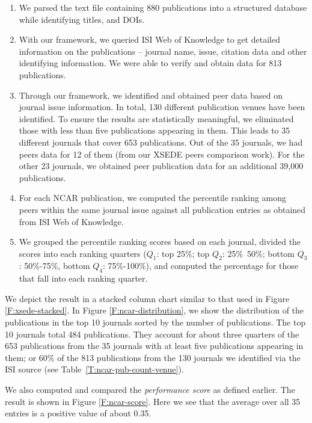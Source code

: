 \documentclass[10pt, conference, compsocconf]{IEEEtran}
\begin{document}
\begin{enumerate}

\item We parsed the text file containing 880 publications into a structured database while identifying titles, and DOIs.

\item With our framework, we queried ISI Web of Knowledge to get detailed information on the publications -- journal name, issue, citation data and other identifying information. We were able to verify and obtain data for 813 publications.

\item Through our framework, we identified and obtained peer data based on journal issue information. In total, 130 different publication venues have been identified. To ensure the results are statistically meaningful, we eliminated those with less than five publications appearing in them.  This leads to 35 different journals that cover 653 publications. Out of the 35 journals, we had peers data for 12 of them (from our XSEDE peers comparison work). For the other 23 journals, we obtained peer publication data for an additional 39,000 publications.

\item For each NCAR publication, we computed the percentile ranking among peers within the same journal issue against all publication entries as obtained from ISI Web of Knowledge.

\item We grouped the percentile ranking scores based on each journal, divided the scores into each ranking quarters ($Q_1$: top 25\%; top $Q_2$: 25\%~50\%; bottom $Q_3$: 50\%-75\%, bottom $Q_4$: 75\%-100\%), and computed the percentage for those that fall into each ranking quarter.

\end{enumerate}

We depict the result in a stacked column chart similar to that used in Figure \ref{F:xsede-stacked}.  In Figure \ref{F:ncar-distribution}, we show the distribution of the publications in the top 10 journals sorted by the number of publications. The top 10 journals total 484 publications. They account for about three quarters of the 653 publications from the 35 journals with at least five publications appearing in them; or 60\% of the 813 publications from the 130 journals we identified via the ISI source (see Table~\ref{T:ncar-pub-count-venue}).

We also computed and compared the \emph{performance score} as defined earlier. The result is shown in Figure \ref{F:ncar-score}. Here we see that the average over all 35 entries is a positive value of about 0.35. 
\end{document}
